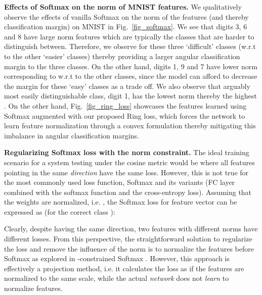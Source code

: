 \documentclass[10pt,twocolumn,letterpaper]{article}
\begin{document}
\textbf{Effects of Softmax on the norm of MNIST features.} We qualitatively observe the effects of vanilla Softmax on the norm of the features (and thereby classification margin) on MNIST in Fig.~\ref{fig_softmax}. We see that digits 3, 6 and 8 have large norm features which are typically the classes that are harder to distinguish between. Therefore, we observe  for these three `difficult' classes (w.r.t to the other `easier' classes) thereby providing a larger angular classification margin to the three classes. On the other hand, digits 1, 9 and 7 have lower norm corresponding to  w.r.t to the other classes, since the model can afford to decrease the margin for these `easy' classes as a trade off. We also observe that arguably most easily distinguishable class, digit 1, has the lowest norm thereby the highest . On the other hand, Fig.~\ref{fig_ring_loss} showcases the features learned using Softmax augmented with our proposed Ring loss, which forces the network to learn feature normalization through a convex formulation thereby mitigating this imbalance in angular classification margins. 






























\textbf{ Regularizing Softmax loss with the norm constraint.}
The ideal training scenario for a system testing under the cosine metric would be where all features pointing in the same \textit{direction} have the same loss. However, this is not true for the most commonly used loss function, Softmax and its variants (FC layer combined with the softmax function and the cross-entropy loss). Assuming that the weights are normalized, i.e. , the Softmax loss for feature vector  can be expressed as (for the correct class ):


Clearly, despite having the same direction, two features with different norms have different losses. From this perspective, the straightforward solution to regularize the loss and remove the influence of the norm is to normalize the features before Softmax as explored in -constrained Softmax  \cite{ranjan2017l2}. However, this approach is effectively a projection method, i.e. it calculates the loss as if the features are normalized to the same scale, while the actual \textit{network} does not \textit{learn} to normalize features.
\end{document}
